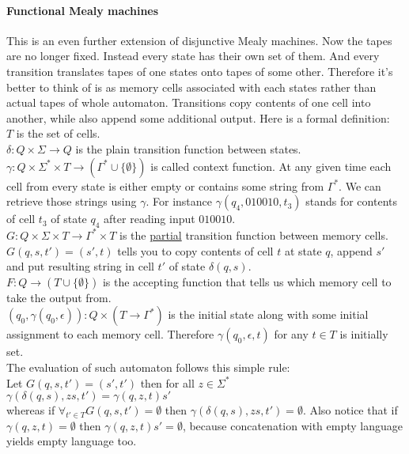 \documentclass[12pt]{article}
\begin{document}
\paragraph{Functional Mealy machines} This is an even further extension of disjunctive Mealy machines. Now the tapes are no longer fixed. Instead every state has their own set of them. And every transition translates tapes of one states onto tapes of some other. Therefore it's better to think of is as memory cells associated with each states rather than actual tapes of whole automaton. Transitions copy contents of one cell into another, while also append some additional output. Here is a formal definition: \\
$T$ is the set of cells. \\
$\delta : Q \times \Sigma \rightarrow Q$ is the plain transition function between states. \\
$\gamma : Q \times \Sigma^* \times T \rightarrow (\Gamma^*\cup\{\emptyset \})$ is called context function. At any given time each cell from every state is either empty  or contains some string from $\Gamma^*$. We can retrieve those strings using $\gamma$. For instance $\gamma(q_4,010010,t_3)$ stands for contents of cell $t_3$ of state $q_4$ after reading input $010010$. \\
$G : Q \times \Sigma \times T \rightarrow  \Gamma^*\times T$ is the \underline{partial} transition function between memory cells.  $G(q,s,t') = (s',t)$ tells you to copy contents of  cell $t$ at state $q$, append $s'$ and put resulting string  in cell $t'$ of state $\delta(q,s)$.  \\
$F : Q \rightarrow (T \cup \{\emptyset\})$ is the accepting function that tells us which memory cell to take the output from. \\
$(q_0,\gamma(q_0,\epsilon)) : Q \times (T \rightarrow \Gamma^*)$ is the initial state along with some initial assignment to each memory cell. Therefore $\gamma(q_0,\epsilon,t)$ for any $t\in T$ is initially set.\\
The evaluation of such automaton follows this simple rule: \\
Let $G(q,s,t') = (s',t')$ then for all $z\in\Sigma^*$ \\
$\gamma(\delta(q,s),zs,t')= \gamma(q,z,t) s' $ \\
whereas if $\forall_{t'\in T} G(q,s,t') = \emptyset$ then  $\gamma(\delta(q,s),zs,t') = \emptyset$.
Also notice that if $\gamma(q,z,t) = \emptyset$ then $\gamma(q,z,t) s' = \emptyset$, because concatenation with empty language yields empty language too. \\
\end{document}
